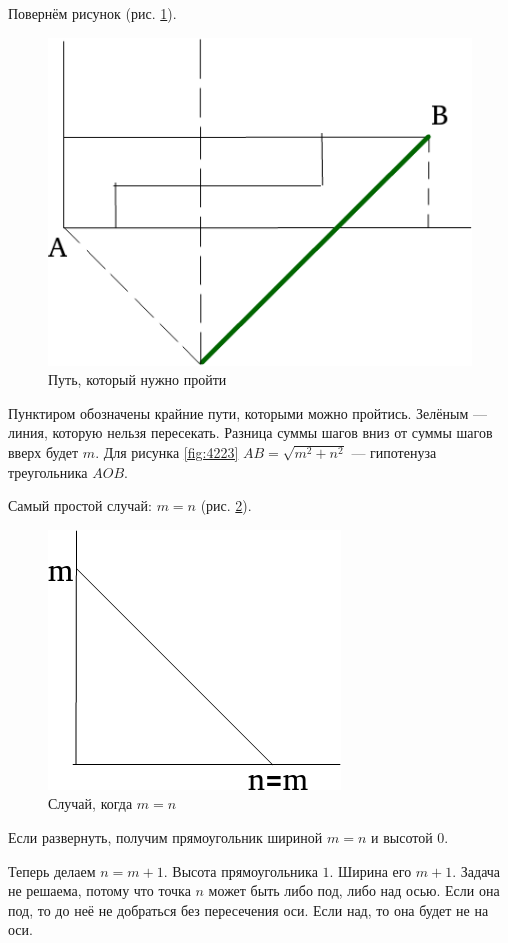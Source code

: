 \begin{enumerate}[label=\alph*)]
Повернём рисунок (рис. \ref{fig:4224}).

\begin{figure}[h!]
  \centering
  \includegraphics[width=.6\textwidth]{./pictures/4_22_4.png}
  \caption{Путь, который нужно пройти}
  \label{fig:4224}
\end{figure}

Пунктиром обозначены крайние пути, которыми можно пройтись.
Зелёным --- линия, которую нельзя пересекать.
Разница суммы шагов вниз от суммы шагов вверх будет $m$.
Для рисунка \ref{fig:4223} $AB = \sqrt{m^2 + n^2}$ --- гипотенуза треугольника $AOB$.

Самый простой случай: $m = n$ (рис. \ref{fig:4225}).

\begin{figure}[h!]
  \centering
  \includegraphics[width=.6\textwidth]{./pictures/4_22_5.png}
  \caption{Случай, когда $m = n$}
  \label{fig:4225}
\end{figure}

Если развернуть, получим прямоугольник шириной $m = n$ и высотой $0$.

Теперь делаем $n = m + 1$.
Высота прямоугольника $1$.
Ширина его $m + 1$.
Задача не решаема, потому что точка $n$ может быть либо под, либо над осью.
Если она под, то до неё не добраться без пересечения оси.
Если над, то она будет не на оси.


\end{enumerate}
